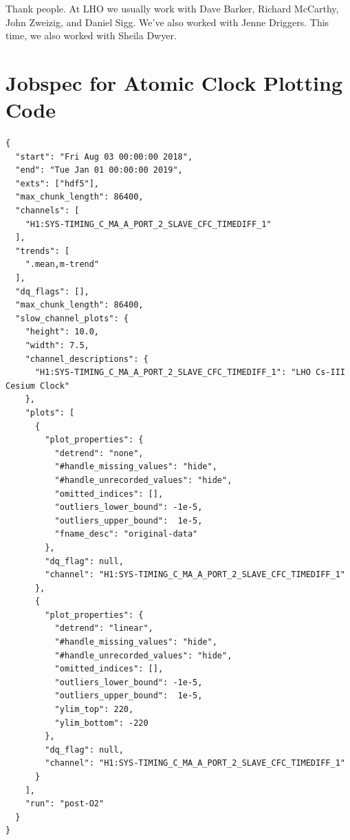 \documentclass{article}
\newcommand*{\TODO}{\textcolor{todo}}
\begin{document}
\TODO{Thank people. At LHO we usually work with Dave Barker, Richard McCarthy, John Zweizig, and Daniel Sigg. We've also worked with Jenne Driggers. This time, we also worked with Sheila Dwyer.}


\clearpage
\appendix
\section{Jobspec for Atomic Clock Plotting Code}
\label{sec:jobspec}
	\begin{lstlisting}
{
  "start": "Fri Aug 03 00:00:00 2018",
  "end": "Tue Jan 01 00:00:00 2019",
  "exts": ["hdf5"],
  "max_chunk_length": 86400,
  "channels": [
    "H1:SYS-TIMING_C_MA_A_PORT_2_SLAVE_CFC_TIMEDIFF_1"
  ],
  "trends": [
    ".mean,m-trend"
  ],
  "dq_flags": [],
  "max_chunk_length": 86400,
  "slow_channel_plots": {
    "height": 10.0,
    "width": 7.5,
    "channel_descriptions": {
      "H1:SYS-TIMING_C_MA_A_PORT_2_SLAVE_CFC_TIMEDIFF_1": "LHO Cs-III Cesium Clock"
    },
    "plots": [
      {
        "plot_properties": {
          "detrend": "none",
          "#handle_missing_values": "hide",
          "#handle_unrecorded_values": "hide",
          "omitted_indices": [],
          "outliers_lower_bound": -1e-5,
          "outliers_upper_bound":  1e-5,
          "fname_desc": "original-data"
        },
        "dq_flag": null,
        "channel": "H1:SYS-TIMING_C_MA_A_PORT_2_SLAVE_CFC_TIMEDIFF_1"
      },
      {
        "plot_properties": {
          "detrend": "linear",
          "#handle_missing_values": "hide",
          "#handle_unrecorded_values": "hide",
          "omitted_indices": [],
          "outliers_lower_bound": -1e-5,
          "outliers_upper_bound":  1e-5,
          "ylim_top": 220,
          "ylim_bottom": -220
        },
        "dq_flag": null,
        "channel": "H1:SYS-TIMING_C_MA_A_PORT_2_SLAVE_CFC_TIMEDIFF_1"
      }
    ],
    "run": "post-O2"
  }
}
\end{lstlisting}
\clearpage
\end{document}

